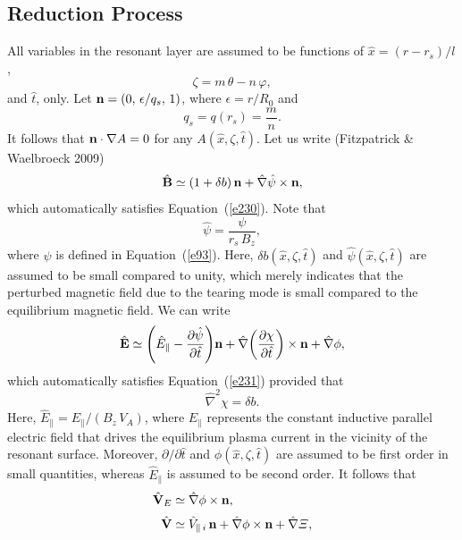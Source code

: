 \documentclass[notitlepage,12pt]{article}
\begin{document}
\subsection{Reduction Process} 
All variables in the resonant layer are assumed to be functions of 
$\hat{x}=(r-r_s)/l$,
 \begin{equation}
 \zeta=m\,\theta-n\,\varphi,
 \end{equation}
 and $\hat{t}$, 
 only. 
Let ${\bf n} = (0,\,\epsilon/q_s,\,1)$, where $\epsilon=r/R_0$ and 
\begin{equation}
q_s=q(r_s)= \frac{m}{n}.
\end{equation}
 It follows that ${\bf n}\cdot\nabla A=0$ for any $A(\hat{x},\zeta,\hat{t})$. 
Let us write (Fitzpatrick \& Waelbroeck 2009)
\begin{equation}\label{e238}
\hat{\bf B} \simeq (1+ \delta b)\,{\bf n} + \hat{\nabla}\hat{\psi}\times {\bf n},
\end{equation}
which automatically satisfies Equation~(\ref{e230}). Note that 
\begin{equation}\label{e247a}
\hat{\psi}=\frac{\psi}{r_s\,B_z},
\end{equation}
 where $\psi$ is defined in Equation~(\ref{e93}).
 Here, $\delta b(\hat{x},\zeta,
 \hat{t})$ and $\hat{\psi}(\hat{x},\zeta,\hat{t})$ are assumed to be small
compared to unity, which merely indicates that the perturbed magnetic field due to the tearing mode is small compared to the
equilibrium magnetic field.  We can write
\begin{equation}
\hat{\bf E} \simeq \left(\hat{E}_\parallel- \frac{\partial \hat{\psi}}{\partial \hat{t}}\right)\!{\bf n} + \hat{\nabla}\!\left(\frac{\partial\chi}{\partial \hat{t}}\right)\times {\bf n} + \hat{\nabla}\phi,
\end{equation}
which automatically satisfies Equation~(\ref{e231}) provided that
\begin{equation}
\hat{\nabla}^2\chi =\delta b.
\end{equation}
Here, $\hat{E}_\parallel = E_\parallel/(B_z\,V_A)$, where $E_\parallel$ represents the constant inductive parallel electric field that drives the equilibrium plasma current in the vicinity of the resonant surface. Moreover, $\partial/\partial \hat{t}$ and $\phi(\hat{x},\zeta,\hat{t})$
are 
assumed to be first order in small quantities, whereas $\hat{E}_\parallel$ is assumed to be second order. 
It follows that
\begin{align}
\hat{\bf V}_E &\simeq \hat{\nabla}\phi\times {\bf n},\\[0.5ex]
\hat{\bf V} &\simeq \hat{V}_{\parallel\,i}\,{\bf n}+  \hat{\nabla}\phi\times {\bf n}+\hat{\nabla}{\mit\Xi},
\end{align}
\end{document}

